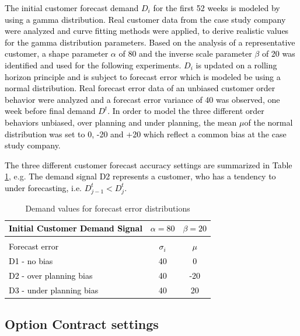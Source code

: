 \documentclass[12pt,english]{article}
\begin{document}
\textcolor{black}{The initial customer forecast demand $D_{i}$ for
the first 52 weeks is modeled by using a gamma distribution. Real
customer data from the case study company were analyzed and curve
fitting methods were applied, to derive realistic values for the gamma
distribution parameters. Based on the analysis of a representative
customer, a shape parameter $\alpha$ of 80 and the inverse scale
parameter $\beta$ of 20 was identified and used for the following
experiments. $D_{i}$ is updated on a rolling horizon principle and
is subject to forecast error which is modeled be using a normal distribution.
Real forecast error data of an unbiased customer order behavior were
analyzed and a forecast error variance of 40 was observed, one week
before final demand $D^{t}$. In order to model the three different
order behaviors unbiased, over planning and under planning, the mean
$\mu$of the normal distribution was set to 0, -20 and +20 which reflect
a common bias at the case study company.}

\textcolor{black}{The three different customer forecast accuracy settings
are summarized in Table}\textcolor{red}{{} \ref{tab:Customer-Demand-Signals}},
e.g.\textcolor{black}{{} The demand signal D2 represents a customer,
who has a tendency to under forecasting, i.e. $D_{j-1}^{t}<D_{j}^{t}$. }

\begin{table}
\centering{}\protect\caption{Demand values for forecast error distributions\label{tab:Customer-Demand-Signals}}
\textcolor{black}{}%
\begin{tabular}{|l|c|c|}
\hline 
\textcolor{black}{Initial Customer Demand Signal} & \textcolor{black}{$\alpha=80$} & \textcolor{black}{$\beta=20$}\tabularnewline
\hline 
\multicolumn{1}{l}{} & \multicolumn{1}{c}{} & \multicolumn{1}{c}{}\tabularnewline
\hline 
\textcolor{black}{Forecast error} & \textcolor{black}{$\sigma_{i}$} & \textcolor{black}{$\mu$}\tabularnewline
\hline 
\hline 
\textcolor{black}{D1 - no bias} & \textcolor{black}{40} & \textcolor{black}{0}\tabularnewline
\hline 
\textcolor{black}{D2 - over planning bias} & \textcolor{black}{40} & \textcolor{black}{-20}\tabularnewline
\hline 
\textcolor{black}{D3 - under planning bias} & \textcolor{black}{40} & \textcolor{black}{20}\tabularnewline
\hline 
\end{tabular}

\end{table}

\subsection{Option Contract settings}
\end{document}
